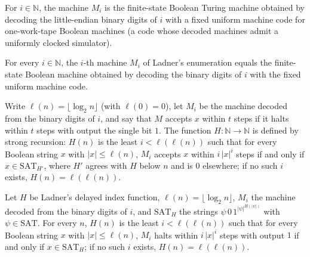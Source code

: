 \begin{definition}
\label{Complexity.ladnerMachine}
\leanok
{}
For $i\in\mathbb N$, the machine $M_i$ is the finite-state Boolean Turing machine obtained
by decoding the little-endian binary digits of $i$ with a fixed uniform machine code for
one-work-tape Boolean machines (a code whose decoded machines admit a uniformly clocked
simulator).
\end{definition}

\begin{theorem}
\label{Complexity.ladnerMachine_eq}
\leanok
{}
For every $i\in\mathbb N$, the $i$-th machine $M_i$ of Ladner's enumeration equals the
finite-state Boolean machine obtained by decoding the binary digits of $i$ with the fixed
uniform machine code.
\end{theorem}

\begin{definition}
\label{Complexity.ladnerH}
\leanok
{}
Write $\ell(n)=\lfloor\log_2 n\rfloor$ (with $\ell(0)=0$), let $M_i$ be the machine decoded
from the binary digits of $i$, and say that $M$ accepts $x$ within $t$ steps if it halts
within $t$ steps with output the single bit $1$. The function $H:\mathbb N\to\mathbb N$ is
defined by strong recursion: $H(n)$ is the least $i<\ell(\ell(n))$ such that for every
Boolean string $x$ with $|x|\le\ell(n)$, $M_i$ accepts $x$ within $i\,|x|^i$ steps if and
only if $x\in\mathrm{SAT}_{H'}$, where $H'$ agrees with $H$ below $n$ and is $0$ elsewhere;
if no such $i$ exists, $H(n)=\ell(\ell(n))$.
\end{definition}

\begin{theorem}
\label{Complexity.ladnerH_eq}
\leanok
{}
Let $H$ be Ladner's delayed index function, $\ell(n)=\lfloor\log_2 n\rfloor$, $M_i$ the
machine decoded from the binary digits of $i$, and $\mathrm{SAT}_H$ the strings
$\psi\,0\,1^{|\psi|^{H(|\psi|)}}$ with $\psi\in\mathrm{SAT}$. For every $n$, $H(n)$ is the
least $i<\ell(\ell(n))$ such that for every Boolean string $x$ with $|x|\le\ell(n)$, $M_i$
halts within $i\,|x|^i$ steps with output $1$ if and only if $x\in\mathrm{SAT}_H$; if no
such $i$ exists, $H(n)=\ell(\ell(n))$.
\end{theorem}

